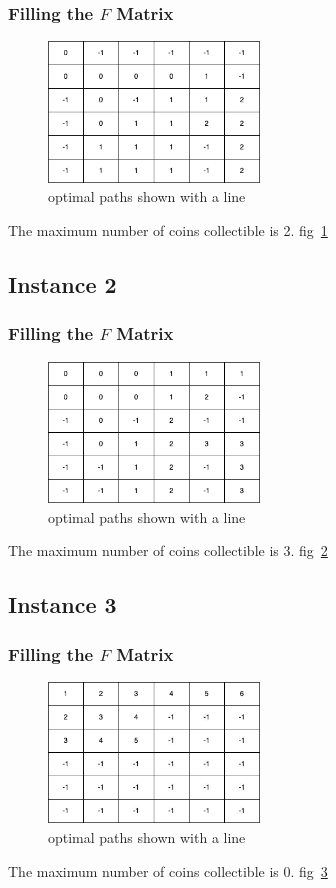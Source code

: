 \subsubsection{Filling the $F$ Matrix}
\begin{figure}[!h]
    \centering
    \includegraphics[width=0.5\textwidth]{image.png}
    \caption{optimal paths shown with a line}
    \label{fig:instance1}
\end{figure}

The maximum number of coins collectible is 2. fig~\ref{fig:instance1}

\subsection{Instance 2}
\subsubsection{Filling the $F$ Matrix}
\begin{figure}[!h]
    \centering
    \includegraphics[width=0.5\textwidth]{image2.png}
    \caption{optimal paths shown with a line}
    \label{fig:instance2}
\end{figure}

The maximum number of coins collectible is 3. fig~\ref{fig:instance2}

\subsection{Instance 3}
\subsubsection{Filling the $F$ Matrix}
\begin{figure}[!h]
    \centering
    \includegraphics[width=0.5\textwidth]{image3.png}
    \caption{optimal paths shown with a line}
    \label{fig:instance3}
\end{figure}
The maximum number of coins collectible is 0. fig~\ref{fig:instance3}

